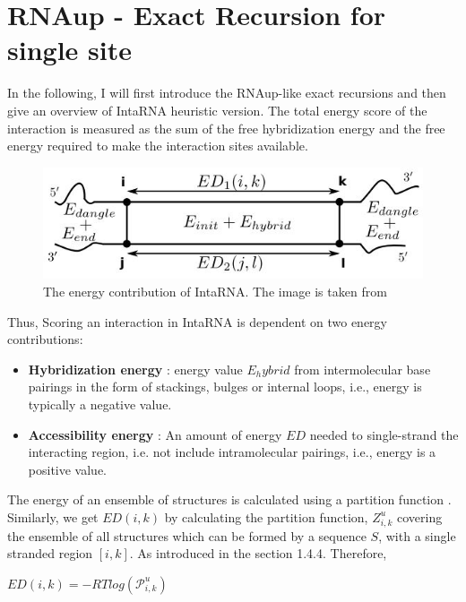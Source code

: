 \documentclass[twoside,a4paper]{report}
\numberwithin{equation}{section}
\begin{document}
	\section{RNAup - Exact Recursion for single site}
	
	In the following, I will first introduce the RNAup-like exact recursions \citep{muckstein2006thermodynamics} and then give an overview of IntaRNA heuristic version. The total energy score of the interaction is measured as the sum of the free hybridization energy and the free energy required to make the interaction sites available.\\
	
		\begin{figure}[tb]
		\includegraphics[width=0.6\linewidth]{inta}
		\centering
		\caption{ The energy contribution of IntaRNA. The image is taken from \citep{gelhausen2018constrained} } 
		\label{fig:inta}
	\end{figure}
	
	Thus, Scoring an interaction in IntaRNA is dependent on two energy contributions:\\
	
	\begin{itemize}
		\item \textbf{Hybridization energy} : energy value $E_hybrid$ from intermolecular base pairings in the form of stackings, bulges or internal loops, i.e., energy is typically a negative value. 
		\item \textbf{Accessibility energy} : An amount of energy  $ED $ needed to single-strand the interacting region, i.e. not include intramolecular pairings, i.e., energy is a positive value. 
	\end{itemize}
	
	
	The energy of an ensemble of structures is calculated using a partition function \citep{mccaskill1990equilibrium}. Similarly, we get $ED(i,k)$ by calculating the partition function, ${Z}_{i,k}^{u}$ covering the ensemble of all structures which can be formed by a sequence $S$, with a single stranded region $[i,k]$. As introduced in the section 1.4.4. Therefore,
	
		\begin{center}
		
		$ED(i,k) = - RTlog(\mathcal{P}_{i,k}^{u})$
		
	\end{center}
	
\end{document}
